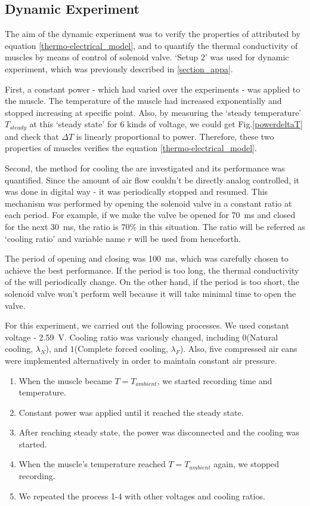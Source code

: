\subsection{Dynamic Experiment}\label{section_dynamic} %

The aim of the dynamic experiment was to verify the properties of \scps attributed by equation \eqref{thermo-electrical_model}, and to quantify the thermal conductivity of muscles by means of control of solenoid valve.
`Setup 2' was used for dynamic experiment, which was previously described in \ref{section_appa}. %

First, a constant power - which had varied over the experiments - was applied to the muscle.
The temperature of the muscle had increased exponentially and stopped increasing at specific point.
Also, by measuring the `steady temperature' $ T_{steady} $ at this `steady state' for 6 kinds of voltage, 
we could get Fig.\ref{powerdeltaT} and check that $ \Delta T $ is linearly proportional to power.
Therefore, these two properties of muscles verifies the equation \eqref{thermo-electrical_model}.

Second, the method for cooling the \scps are investigated and its performance was quantified. %
Since the amount of air flow couldn't be directly analog controlled,
it was done in digital way - it was periodically stopped and resumed.
This mechanism was performed by opening the solenoid valve in a constant ratio at each period. For example, if we make the valve be opened for \SI{70}{\milli\second} and closed for the next \SI{30}{\milli\second}, the ratio is 70\% in this situation. 
The ratio will be referred as `cooling ratio' and variable name $r$ will be used from henceforth.

The period of opening and closing was \SI{100}{\milli\second}, which was carefully chosen to achieve the best performance. If the period is too long, the thermal conductivity of the \scps will periodically change. On the other hand, if the period is too short, the solenoid valve won't perform well because it will take minimal time to open the valve. 

For this experiment, we carried out the following processes. We used constant voltage - \SI{2.59}{\volt}. Cooling ratio was variously changed, including $0$(Natural cooling, $\lambda_{N}$), and $1$(Complete forced cooling, $\lambda_{F}$). Also, five compressed air cans were implemented alternatively in order to maintain constant air pressure. 
\begin{enumerate}
	\item When the muscle became $T=T_{ambient}$, we started recording time and temperature.
	\item Constant power was applied until it reached the steady state.
	\item After reaching steady state, the power was disconnected and the cooling was started. 
	\item When the muscle's temperature reached $T=T_{ambient}$ again, we stopped recording. 
	\item We repeated the process 1-4 with other voltages and cooling ratios.
\end{enumerate}


